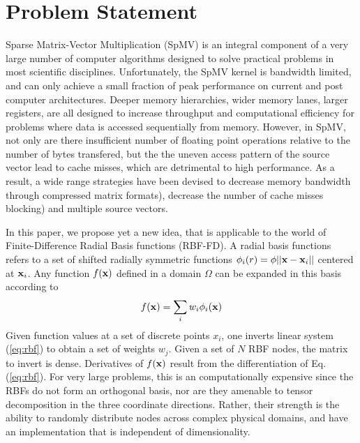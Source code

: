 \section{Problem Statement}

Sparse Matrix-Vector Multiplication (SpMV) is an integral component of a very large
number of computer algorithms designed to solve practical problems in most scientific disciplines. Unfortunately, the SpMV kernel is bandwidth limited, and can only achieve a small fraction of peak performance on current and post computer architectures. Deeper memory hierarchies, wider memory lanes, larger registers, are all designed to increase throughput and computational efficiency for problems where data is accessed sequentially from memory. However, in SpMV, not only are there insufficient number of floating point operations relative to the number of bytes transfered, but the the uneven access pattern of the source vector lead to cache misses, which are detrimental to high performance. As a result, a wide range 
strategies have been devised to decrease memory bandwidth through compressed matrix
formats)\cite{}, decrease the number of cache misses\cite{} %
blocking\cite{}) and multiple source vectors\cite{}. 


In this paper, we propose yet a new idea, that is applicable to the world of 
Finite-Difference Radial Basis functions (RBF-FD). A radial basis functions refers
to a set of shifted radially symmetric functions $\phi_i(r) =\phi{||{\bf x}-{\bf x}_i||}$ centered at ${\bf x}_i$\cite{}. Any function $f({\bf x})$ defined in a domain $\Omega$ can be expanded in this basis according to
\begin{equation}
f({\bf x}) =  \sum_i w_i \phi_i({\bf x}) \label{eq:rbf}
\end{equation}
Given function values at a set of discrete points $x_i$, one inverts linear system 
(\ref{eq:rbf})  to obtain a set of weights $w_j$. Given a set of $N$ RBF nodes, the matrix to invert is dense. Derivatives of $f({\bf x})$ result from the differentiation of Eq. (\ref{eq:rbf}). For very large problems, this is an computationally expensive since the RBFs do not form an orthogonal basis, nor are they amenable to tensor decomposition in the three coordinate directions. Rather, their strength is the ability to randomly distribute nodes across complex physical domains, and have an implementation that is independent of dimensionality. %

